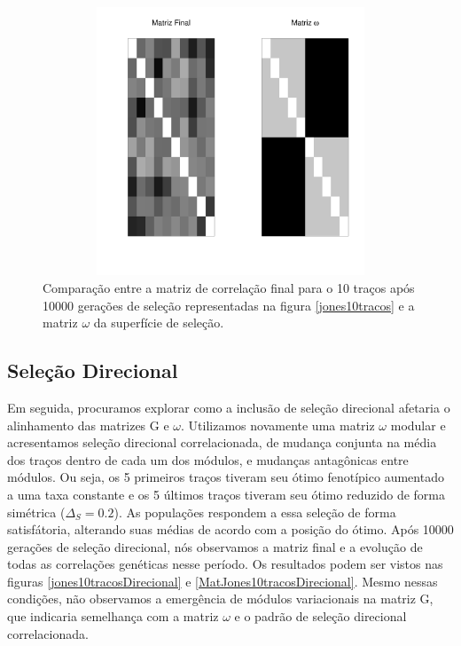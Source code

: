 \documentclass[a4paper, 12pt, titlepage, onecolumn]{article}
\numberwithin{equation}{section}
\numberwithin{table}{section}
\begin{document}
\begin{center}
\begin{figure}[H]
  \includegraphics[width=150mm, height=80mm]{figuras/Mat10tracos}
  \caption{Comparação entre a matriz de correlação final para o 10 traços após 10000
   gerações de seleção representadas na figura \ref{jones10tracos} e a matriz $\omega$ da superfície de seleção.}
  \label{MatJones10tracos}
\end{figure}
\end{center}


\subsection{Seleção Direcional}

Em seguida, procuramos explorar como a inclusão de seleção direcional afetaria o
alinhamento das matrizes G e $\omega$. Utilizamos novamente uma matriz
$\omega$ modular e acresentamos seleção direcional correlacionada, de
mudança conjunta na média dos traços dentro de cada um dos módulos, e
mudanças antagônicas entre módulos. Ou seja, os 5 primeiros traços
tiveram seu ótimo fenotípico aumentado a uma taxa constante 
 e os 5 últimos traços tiveram seu ótimo reduzido de forma simétrica ($\Delta_S=0.2$).  As populações
respondem a essa seleção de forma satisfátoria, alterando suas médias de
acordo com a posição do ótimo. Após 10000 gerações de seleção
direcional,
nós observamos a matriz final e a evolução de todas as correlações
genéticas nesse período. Os resultados podem ser vistos nas figuras
\ref{jones10tracosDirecional} e \ref{MatJones10tracosDirecional}. Mesmo
nessas condições, não observamos a emergência de módulos variacionais na
matriz G, que indicaria semelhança com a matriz $\omega$ e o padrão de
seleção direcional correlacionada.
\end{document}
